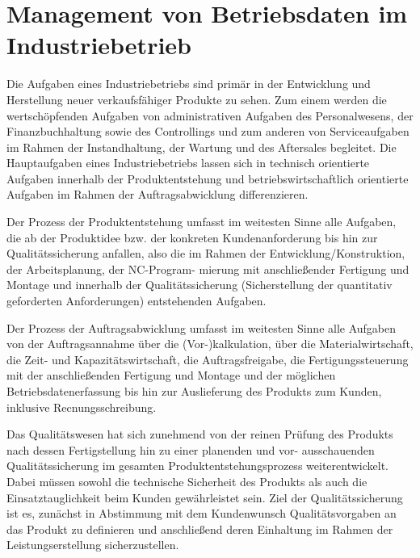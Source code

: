 \section{Management von Betriebsdaten im Industriebetrieb}\label{sec:usecase}

Die Aufgaben eines Industriebetriebs sind primär in der Entwicklung und Herstellung neuer verkaufsfähiger Produkte zu sehen. Zum einem werden die wertschöpfenden Aufgaben von administrativen Aufgaben des Personalwesens, der Finanzbuchhaltung sowie des Controllings und zum anderen von Serviceaufgaben im Rahmen der Instandhaltung, der Wartung und des Aftersales begleitet. Die Hauptaufgaben eines Industriebetriebs lassen sich in technisch orientierte Aufgaben innerhalb der Produktentstehung und betriebswirtschaftlich orientierte Aufgaben im Rahmen der Auftragsabwicklung differenzieren.

Der Prozess der Produktentstehung umfasst im weitesten Sinne alle Aufgaben, die ab der Produktidee bzw. der konkreten Kundenanforderung bis hin zur Qualitätssicherung anfallen, also die im Rahmen der Entwicklung/Konstruktion, der Arbeitsplanung, der NC-Program- mierung mit anschließender Fertigung und Montage und innerhalb der Qualitätssicherung (Sicherstellung der quantitativ geforderten Anforderungen) entstehenden Aufgaben.

Der Prozess der Auftragsabwicklung umfasst im weitesten Sinne alle Aufgaben von der Auftragsannahme über die (Vor-)kalkulation, über die Materialwirtschaft, die Zeit- und Kapazitätswirtschaft, die Auftragsfreigabe, die Fertigungssteuerung mit der anschließenden Fertigung und Montage und der möglichen Betriebsdatenerfassung bis hin zur Auslieferung des Produkts zum Kunden, inklusive Recnungsschreibung.

Das Qualitätswesen hat sich zunehmend von der reinen Prüfung des Produkts nach dessen Fertigstellung hin zu einer planenden und vor- ausschauenden Qualitätssicherung im gesamten Produktentstehungsprozess weiterentwickelt. Dabei müssen sowohl die technische Sicherheit des Produkts als auch die Einsatztauglichkeit beim Kunden gewährleistet sein. Ziel der Qualitätssicherung ist es, zunächst in Abstimmung mit dem Kundenwunsch Qualitätsvorgaben an das Produkt zu definieren und anschließend deren Einhaltung im Rahmen der Leistungserstellung sicherzustellen.

